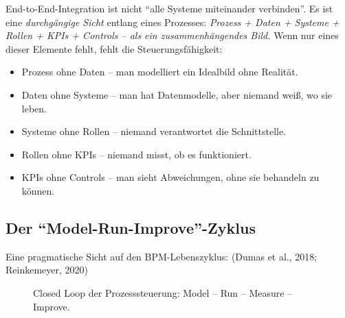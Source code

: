 \documentclass[11pt,a4paper,oneside]{article}
\newcommand{\quelle}[1]{{\footnotesize\color{lpGray}(#1)}}
\begin{document}
End-to-End-Integration ist nicht ``alle Systeme miteinander verbinden''. Es ist eine \emph{durchgängige Sicht} entlang eines Prozesses: \emph{Prozess + Daten + Systeme + Rollen + KPIs + Controls -- als ein zusammenhängendes Bild.} Wenn nur eines dieser Elemente fehlt, fehlt die Steuerungsfähigkeit:

\begin{itemize}
  \item Prozess ohne Daten -- man modelliert ein Idealbild ohne Realität.
  \item Daten ohne Systeme -- man hat Datenmodelle, aber niemand weiß, wo sie leben.
  \item Systeme ohne Rollen -- niemand verantwortet die Schnittstelle.
  \item Rollen ohne KPIs -- niemand misst, ob es funktioniert.
  \item KPIs ohne Controls -- man sieht Abweichungen, ohne sie behandeln zu können.
\end{itemize}

\subsection{Der ``Model-Run-Improve''-Zyklus}

Eine pragmatische Sicht auf den BPM-Lebenszyklus: \quelle{Dumas et al., 2018; Reinkemeyer, 2020}

\begin{figure}[h]
\centering
{}
\caption{\sffamily Closed Loop der Prozesssteuerung: Model -- Run -- Measure -- Improve.}
\label{fig:konzept-71t06}
\end{figure}
\end{document}
